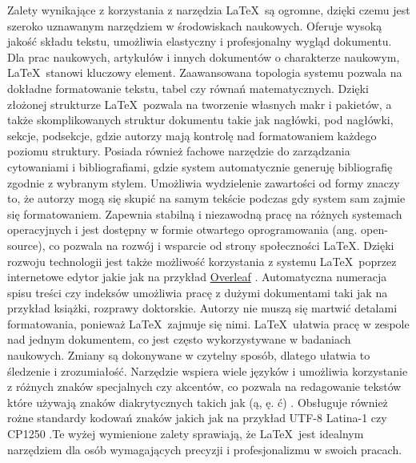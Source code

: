 Zalety wynikające z korzystania z narzędzia \LaTeX\ są ogromne, dzięki czemu jest szeroko uznawanym narzędziem w środowiskach naukowych. Oferuje wysoką jakość składu tekstu, umożliwia elastyczny i profesjonalny wygląd dokumentu. Dla prac naukowych, artykułów i innych dokumentów o charakterze naukowym, \LaTeX\ stanowi kluczowy element. Zaawansowana topologia systemu pozwala na dokładne formatowanie tekstu, tabel czy równań matematycznych. Dzięki złożonej strukturze \LaTeX\ pozwala na tworzenie własnych makr i pakietów, a także skomplikowanych struktur dokumentu takie jak nagłówki, pod nagłówki, sekcje, podsekcje, gdzie autorzy mają kontrolę nad formatowaniem każdego poziomu struktury. Posiada również fachowe narzędzie do zarządzania cytowaniami i bibliografiami, gdzie system automatycznie generuję bibliografię zgodnie z wybranym stylem. Umożliwia wydzielenie zawartości od formy znaczy to, że autorzy mogą się skupić na samym tekście podczas gdy system sam zajmie się formatowaniem. Zapewnia stabilną i niezawodną pracę na różnych systemach operacyjnych i jest dostępny w formie otwartego oprogramowania (ang. open-source), co pozwala na rozwój i wsparcie od strony społeczności \LaTeX. Dzięki rozwoju technologii jest także możliwość korzystania z systemu \LaTeX\ poprzez internetowe edytor jakie jak na przykład \href{https://www.overleaf.com/}{Overleaf}
. Automatyczna numeracja spisu treści czy indeksów umożliwia pracę z dużymi dokumentami taki jak na przykład książki, rozprawy doktorskie. Autorzy nie muszą się martwić detalami formatowania, ponieważ \LaTeX\ zajmuje się nimi. \LaTeX\ ułatwia pracę w zespole nad jednym dokumentem, co jest często wykorzystywane w badaniach naukowych. Zmiany są dokonywane w czytelny sposób, dlatego ułatwia to śledzenie i zrozumiałość. Narzędzie wspiera wiele języków i umożliwia korzystanie z różnych znaków specjalnych czy akcentów, co pozwala na redagowanie tekstów które używają znaków diakrytycznych takich jak (ą, ę. ć) . Obsługuje również rożne standardy kodowań znaków jakich jak na przykład UTF-8 Latina-1 czy CP1250 .Te wyżej wymienione zalety sprawiają, że \LaTeX\ jest idealnym narzędziem dla osób wymagających precyzji i profesjonalizmu w swoich pracach. 

